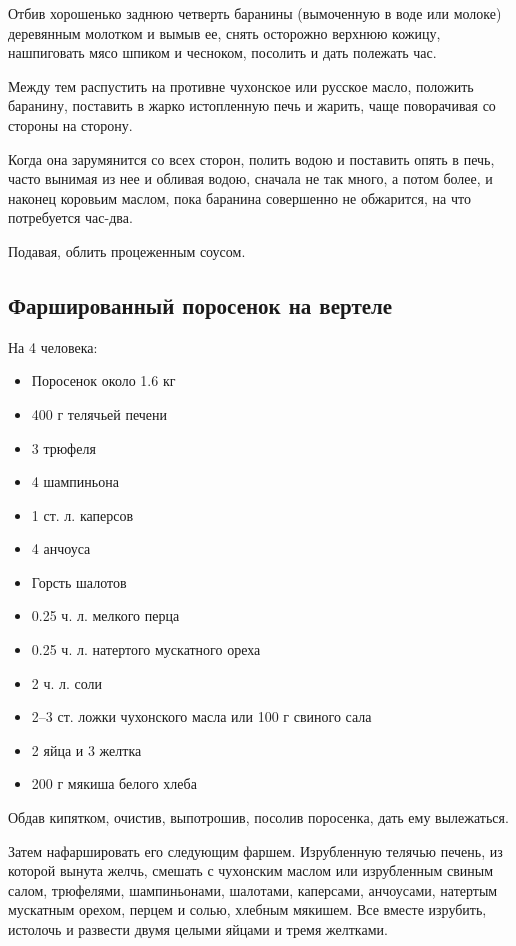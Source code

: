 Отбив хорошенько заднюю четверть баранины (вымоченную в воде или молоке) деревянным молотком и вымыв ее, снять осторожно верхнюю кожицу, нашпиговать мясо шпиком и чесноком, посолить и дать полежать час.

Между тем распустить на противне чухонское или русское масло, положить баранину, поставить в жарко истопленную печь и жарить, чаще поворачивая со стороны на сторону.

Когда она зарумянится со всех сторон, полить водою и поставить опять в печь, часто вынимая из нее и обливая водою, сначала не так много, а потом более, и наконец коровьим маслом, пока баранина совершенно не обжарится, на что потребуется час-два.

Подавая, облить процеженным соусом.

\subsection{Фаршированный поросенок на вертеле}

На 4 человека:

\begin{itemize} 
	\item  Поросенок около 1.6 кг 
    \item 400 г телячьей печени 
    \item 3 трюфеля 
    \item 4 шампиньона 
    \item 1 ст. л. каперсов 
    \item 4 анчоуса 
    \item Горсть шалотов 
    \item 0.25 ч. л. мелкого перца 
    \item 0.25 ч. л. натертого мускатного ореха 
    \item 2 ч. л. соли 
    \item 2–3 ст. ложки чухонского масла или 100 г свиного сала 
    \item 2 яйца и 3 желтка 
    \item 200 г мякиша белого хлеба
\end{itemize}

Обдав кипятком, очистив, выпотрошив, посолив поросенка, дать ему вылежаться.

Затем нафаршировать его следующим фаршем. Изрубленную телячью печень, из которой вынута желчь, смешать с чухонским маслом или изрубленным свиным салом, трюфелями, шампиньонами, шалотами, каперсами, анчоусами, натертым мускатным орехом, перцем и солью, хлебным мякишем. Все вместе изрубить, истолочь и развести двумя целыми яйцами и тремя желтками.


